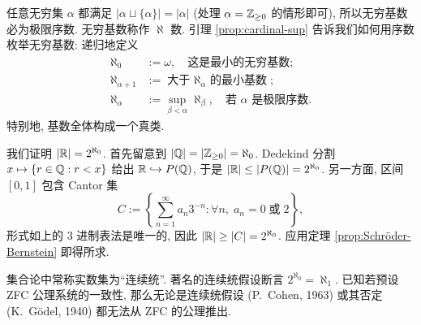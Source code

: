 任意无穷集 $\alpha$ 都满足 $|\alpha \sqcup \{\alpha\}| = |\alpha|$ (处理 $\alpha=\mathbb{Z}_{\geq 0}$ 的情形即可), 所以无穷基数必为极限序数. 无穷基数称作 $\aleph$ 数. 引理 \ref{prop:cardinal-sup} 告诉我们如何用序数枚举无穷基数: 递归地定义
\begin{align*}
	\aleph_0 & := \omega, \quad \text{这是最小的无穷基数}; \\
	\aleph_{\alpha+1} & := \text{大于 $\aleph_\alpha$ 的最小基数}; \\
	\aleph_\alpha & := \sup_{\beta < \alpha} \aleph_\beta, \quad \text{若 $\alpha$ 是极限序数}.
\end{align*}
特别地, 基数全体构成一个真类.

\begin{example}[Cantor]\label{eg:continuum}
	我们证明 $|\mathbb{R}| = 2^{\aleph_0}$. 首先留意到 $|\mathbb{Q}|=|\mathbb{Z}_{\geq 0}|=\aleph_0$. Dedekind 分割 $x \mapsto \{r \in \mathbb{Q}: r < x \}$ 给出 $\mathbb{R} \hookrightarrow P(\mathbb{Q})$, 于是 $|\mathbb{R}| \leq |P(\mathbb{Q})|=2^{\aleph_0}$. 另一方面, 区间 $[0,1]$ 包含 Cantor 集
	\[ C := \left\{ \sum_{n=1}^\infty a_n 3^{-n}: \forall n, \; a_n = 0 \;\text{或}\; 2  \right\}, \]
	形式如上的 $3$ 进制表法是唯一的, 因此 $|\mathbb{R}| \geq |C| = 2^{\aleph_0}$. 应用定理 \ref{prop:Schröder-Bernstein} 即得所求.
\end{example}

集合论中常称实数集为``连续统''. 著名的连续统假设断言 $2^{\aleph_0} = \aleph_1$. 已知若预设 ZFC 公理系统的一致性, 那么无论是连续统假设 (P.\ Cohen, 1963) 或其否定 (K.\ Gödel, 1940) 都无法从 ZFC 的公理推出.


